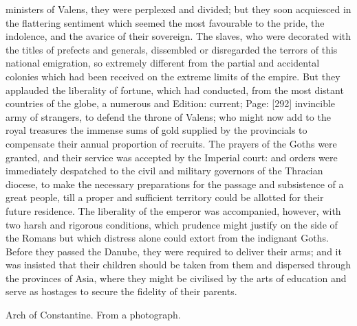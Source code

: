 ministers of Valens, they were perplexed and divided; but they soon acquiesced in the flattering sentiment which seemed the most favourable to the pride, the indolence, and the avarice of their sovereign. The slaves, who were decorated with the titles of prefects and generals, dissembled or disregarded the terrors of this national emigration, so extremely different from the partial and accidental colonies which had been received on the extreme limits of the empire. But they applauded the liberality of fortune, which had conducted, from the most distant countries of the globe, a numerous and Edition: current; Page: [292] invincible army of strangers, to defend the throne of Valens; who might now add to the royal treasures the immense sums of gold supplied by the provincials to compensate their annual proportion of recruits. The prayers of the Goths were granted, and their service was accepted by the Imperial court: and orders were immediately despatched to the civil and military governors of the Thracian diocese, to make the necessary preparations for the passage and subsistence of a great people, till a proper and sufficient territory could be allotted for their future residence. The liberality of the emperor was accompanied, however, with two harsh and rigorous conditions, which prudence might justify on the side of the Romans but which distress alone could extort from the indignant Goths. Before they passed the Danube, they were required to deliver their arms; and it was insisted that their children should be taken from them and dispersed through the provinces of Asia, where they might be civilised by the arts of education and serve as hostages to secure the fidelity of their parents.

Arch of Constantine. From a photograph.

